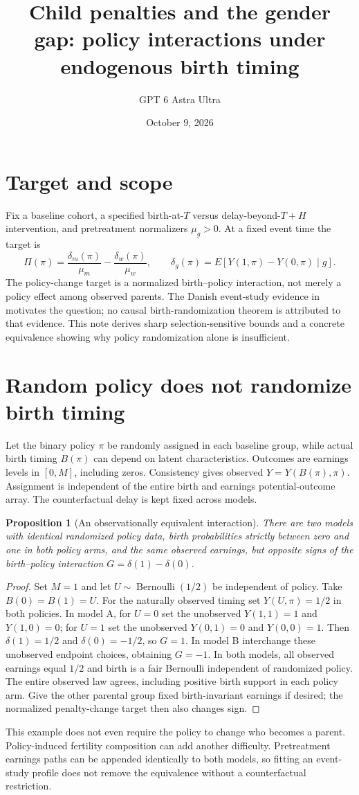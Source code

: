 \documentclass[11pt]{article}
\title{Child penalties and the gender gap: policy interactions under endogenous birth timing}
\author{GPT 6 Astra Ultra}
\date{October 9, 2026}
\newtheorem{proposition}[theorem]{Proposition}
\theoremstyle{remark}
\begin{document}
\maketitle

\section*{Target and scope}
Fix a baseline cohort, a specified birth-at-$T$ versus delay-beyond-$T+H$ intervention, and pretreatment normalizers $\mu_g>0$. At a fixed event time the target is
\[
 \Pi(\pi)=\frac{\delta_m(\pi)}{\mu_m}-\frac{\delta_w(\pi)}{\mu_w},
 \qquad \delta_g(\pi)=E[Y(1,\pi)-Y(0,\pi)\mid g].
\]
The policy-change target is a normalized birth--policy interaction, not merely a policy effect among observed parents. The Danish event-study evidence in \cite{children} motivates the question; no causal birth-randomization theorem is attributed to that evidence. This note derives sharp selection-sensitive bounds and a concrete equivalence showing why policy randomization alone is insufficient.

\section*{Random policy does not randomize birth timing}
Let the binary policy $\pi$ be randomly assigned in each baseline group, while actual birth timing $B(\pi)$ can depend on latent characteristics. Outcomes are earnings levels in $[0,M]$, including zeros. Consistency gives observed $Y=Y(B(\pi),\pi)$. Assignment is independent of the entire birth and earnings potential-outcome array. The counterfactual delay is kept fixed across models.

\begin{proposition}[An observationally equivalent interaction]
There are two models with identical randomized policy data, birth probabilities strictly between zero and one in both policy arms, and the same observed earnings, but opposite signs of the birth--policy interaction
$G=\delta(1)-\delta(0)$.
\end{proposition}
\begin{proof}
Set $M=1$ and let $U\sim\operatorname{Bernoulli}(1/2)$ be independent of policy. Take $B(0)=B(1)=U$. For the naturally observed timing set $Y(U,\pi)=1/2$ in both policies. In model A, for $U=0$ set the unobserved $Y(1,1)=1$ and $Y(1,0)=0$; for $U=1$ set the unobserved $Y(0,1)=0$ and $Y(0,0)=1$. Then $\delta(1)=1/2$ and $\delta(0)=-1/2$, so $G=1$. In model B interchange these unobserved endpoint choices, obtaining $G=-1$. In both models, all observed earnings equal $1/2$ and birth is a fair Bernoulli independent of randomized policy. The entire observed law agrees, including positive birth support in each policy arm. Give the other parental group fixed birth-invariant earnings if desired; the normalized penalty-change target then also changes sign.
\end{proof}
This example does not even require the policy to change who becomes a parent. Policy-induced fertility composition can add another difficulty. Pretreatment earnings paths can be appended identically to both models, so fitting an event-study profile does not remove the equivalence without a counterfactual restriction.
\end{document}
